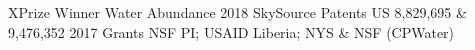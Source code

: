 
\begin{cvhonors}
  \cvhonor
    {XPrize Winner}
    {Water Abundance 2018}
    {}
    {SkySource}
  \cvhonor
    {Patents}
    {US 8,829,695 \& 9,476,352}
    {}
    {2017}
  \cvhonor
    {Grants}
    {NSF PI; USAID Liberia; NYS \& NSF (CPWater)}
    {}
    {}
\end{cvhonors}
